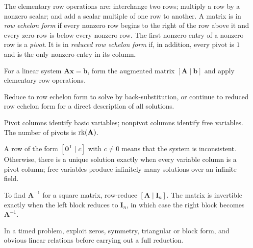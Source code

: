     \begin{definition}
        The elementary row operations are: interchange two rows; multiply a row
        by a nonzero scalar; and add a scalar multiple of one row to another.
        A matrix is in \emph{row echelon form} if every nonzero row begins to the
        right of the row above it and every zero row is below every nonzero row.
        The first nonzero entry of a nonzero row is a \emph{pivot}. It is in
        \emph{reduced row echelon form} if, in addition, every pivot is $1$ and
        is the only nonzero entry in its column.
    \end{definition}

    \begin{algorithm}
        For a linear system $\mathbf{A}\mathbf{x}=\mathbf{b}$, form the
        augmented matrix $[\mathbf{A}\mid\mathbf{b}]$ and apply elementary row
        operations.
        \begin{bookitems}
            \item Reduce to row echelon form to solve by back-substitution, or
                  continue to reduced row echelon form for a direct description
                  of all solutions.
            \item Pivot columns identify basic variables; nonpivot columns
                  identify free variables. The number of pivots is
                  $\operatorname{rk}(\mathbf{A})$.
            \item A row of the form
                  $[\mathbf{0}^{\mathsf T}\mid c]$ with $c\neq0$ means that the
                  system is inconsistent. Otherwise, there is a unique solution
                  exactly when every variable column is a pivot column; free
                  variables produce infinitely many solutions over an infinite
                  field.
            \item To find $\mathbf{A}^{-1}$ for a square matrix, row-reduce
                  $[\mathbf{A}\mid\mathbf{I}_n]$. The matrix is invertible
                  exactly when the left block reduces to $\mathbf{I}_n$, in
                  which case the right block becomes $\mathbf{A}^{-1}$.
        \end{bookitems}
        In a timed problem, exploit zeros, symmetry, triangular or block form,
        and obvious linear relations before carrying out a full reduction.
    \end{algorithm}


